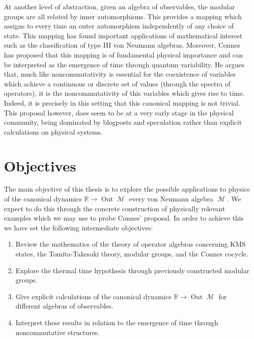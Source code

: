 \documentclass{article}
\DeclareMathOperator{\Out}{Out}
\DeclareMathOperator{\M}{\mathcal{M}}
\begin{document}
At another level of abstraction, given an algebra of observables, the modular groups are all related by inner automorphisms\cite{Connes1973}. This provides a mapping which assigns to every time an outer automorphism independently of any choice of state. This mapping has found important applications of mathematical interest such as the classification of type III von Neumann algebras. Moreover, Connes has proposed that this mapping is of fundamental physical importance and can be interpreted as the emergence of time through quantum variability\cite{Connes2015}. He argues that, much like noncommutativity is essential for the coexistence of variables which achieve a continuous or discrete set of values (through the spectra of operators), it is the noncommutativity of this variables which gives rise to time. Indeed, it is precisely in this setting that this canonical mapping is not trivial. This proposal however, does seem to be at a very early stage in the physical community, being dominated by blogposts and speculation rather than explicit calculations on physical systems\cite{Connes2007, Vystavillubosmotlv2016}.

\section{Objectives}\label{sec:objectives}

The main objective of this thesis is to explore the possible applications to physics of the canonical dynamics $\mathbb{R}\rightarrow\Out\M$ every von Neumann algebra $\M$. We expect to do this through the concrete construction of physically relevant examples which we may use to probe Connes' proposal. In order to achieve this we have set the following intermediate objectives:
\begin{enumerate}
\item Review the mathematics of the theory of operator algebras concerning KMS states, the Tomita-Takesaki theory, modular groups, and the Connes cocycle.
\item Explore the thermal time hypothesis through previously constructed modular groups\cite{Connes1994a, Bisognano1975, Bisognano1976, Rovelli1993a, Borchers1999}.
\item Give explicit calculations of the canonical dynamics $\mathbb{R}\rightarrow\Out\M$ for different algebras of observables.
\item Interpret these results in relation to the emergence of time through noncommutative structures.
\end{enumerate}
\end{document}
